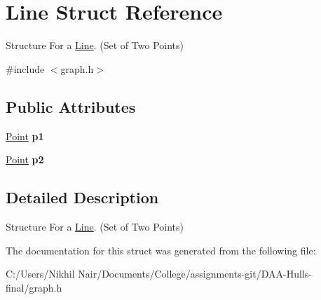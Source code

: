 \hypertarget{struct_line}{}\section{Line Struct Reference}
\label{struct_line}


Structure For a \mbox{\hyperlink{struct_line}{Line}}. (Set of Two Points)  




{\ttfamily \#include $<$graph.\+h$>$}

\subsection*{Public Attributes}
\begin{DoxyCompactItemize}
\item 
\mbox{\label{struct_line_a2ae082894080ee1d0757c40c2b4a7daf}} 
\mbox{\hyperlink{struct_point}{Point}} {\bfseries p1}
\item 
\mbox{\label{struct_line_abebd4172ec43b06b1b04bb59904fc2a4}} 
\mbox{\hyperlink{struct_point}{Point}} {\bfseries p2}
\end{DoxyCompactItemize}


\subsection{Detailed Description}
Structure For a \mbox{\hyperlink{struct_line}{Line}}. (Set of Two Points) 



The documentation for this struct was generated from the following file\+:\begin{DoxyCompactItemize}
\item 
C\+:/\+Users/\+Nikhil Nair/\+Documents/\+College/assignments-\/git/\+D\+A\+A-\/\+Hulls-\/final/graph.\+h\end{DoxyCompactItemize}
